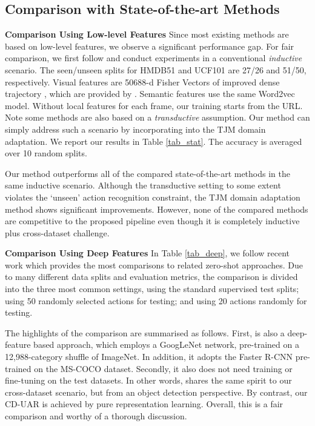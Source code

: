 \documentclass[10pt,twocolumn,letterpaper]{article}
\begin{document}
\subsection{Comparison with State-of-the-art Methods}
\noindent\textbf{Comparison Using Low-level Features} Since most existing methods are based on low-level features, we observe a significant performance gap. For fair comparison, we first follow \cite{2017_CVPR_errorCorection} and conduct experiments in a conventional \textit{inductive} scenario. The seen/unseen splits for HMDB51 and UCF101 are 27/26 and 51/50, respectively. Visual features are 50688-d Fisher Vectors of improved dense trajectory \cite{idtfWang2013}, which are provided by \cite{2016_XuXun_prioristised}. Semantic features use the same Word2vec model. Without local features for each frame, our training starts from the URL. Note some methods \cite{2015_ICIP_Xuxun} are also based on a \textit{transductive} assumption. Our method can simply address such a scenario by incorporating  into the TJM domain adaptation. We report our results in Table \ref{tab_stat}. The accuracy is averaged over 10 random splits.

Our method outperforms all of the compared state-of-the-art methods in the same inductive scenario. Although the transductive setting to some extent violates the `unseen' action recognition constraint, the TJM domain adaptation method shows significant improvements. However, none of the compared methods are competitive to the proposed pipeline even though it is completely inductive plus cross-dataset challenge.

\noindent\textbf{Comparison Using Deep Features} In Table \ref{tab_deep}, we follow recent work \cite{2017_ICCV_Spatial_aware} which
provides the most comparisons to related zero-shot approaches.
Due to many different data splits and evaluation metrics,
the comparison is divided into the three most
common settings, \ie using the standard
supervised test splits; using 50 randomly selected actions
for testing; and using 20 actions randomly for testing.

The highlights of the comparison are summarised as follows. First, \cite{2017_ICCV_Spatial_aware} is also a deep-feature based approach, which employs a GoogLeNet network, pre-trained on a 12,988-category shuffle of ImageNet. In addition, it adopts the Faster R-CNN pre-trained on the MS-COCO dataset. Secondly, it also does not need training or fine-tuning on the test datasets. In other words, \cite{2017_ICCV_Spatial_aware} shares the same spirit to our cross-dataset scenario, but from an object detection perspective. By contrast, our CD-UAR is achieved by pure representation learning. Overall, this is a fair comparison and worthy of a thorough discussion.
\end{document}
